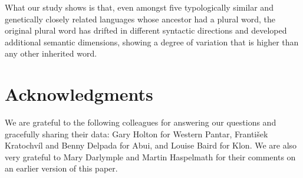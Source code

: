  What our study shows is that, even amongst five typologically similar and genetically closely related languages whose ancestor had a plural word, the original plural word has drifted in different syntactic directions and developed additional semantic dimensions, showing a degree of variation that is higher than any other inherited word.


\section*{Acknowledgments}
We are grateful to the following colleagues for answering our questions and gracefully sharing their data: Gary Holton for Western Pantar, Franti\v{s}ek Kratochv\'il and Benny Delpada for Abui, and Louise Baird for Klon. We are also very grateful to Mary Darlymple and Martin Haspelmath for their comments on an earlier version of this paper.

